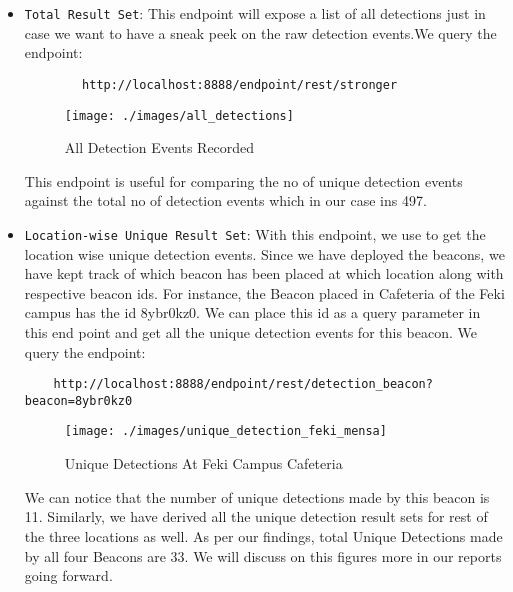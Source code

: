 \begin{itemize}
	\item \texttt{Total Result Set}: This endpoint will expose a list of all detections just in case we want to have a sneak peek on the  raw detection events.We query the  endpoint:
		\begin{verbatim}
		http://localhost:8888/endpoint/rest/stronger
		\end{verbatim}
		\begin{figure}[H]
			\centering
			\texttt{[image: ./images/all\_detections]}
			\caption{All Detection Events Recorded}
			\label{figure1:all_detection_events_recorded}
		\end{figure}
	This endpoint is useful for comparing the no of unique detection events against the total no of detection events which in our case ins 497.
		
	\item \texttt{Location-wise Unique Result Set}: With this endpoint, we use to get the location wise unique detection events. Since we have deployed the beacons, we have kept track of which beacon has been placed at which location along with respective beacon ids. For instance, the Beacon placed in Cafeteria of the Feki campus  has the id 8ybr0kz0. We can place this id as a query parameter in this end point and get all the unique detection events for this beacon.
	We query the endpoint:
	\begin{verbatim}
	http://localhost:8888/endpoint/rest/detection_beacon?beacon=8ybr0kz0
	\end{verbatim}
	\begin{figure}[H]
		\centering
		\texttt{[image: ./images/unique\_detection\_feki\_mensa]}
		\caption{Unique Detections At Feki Campus Cafeteria}
		\label{figure1:unique_detections_at_feki_campus_mensa}
	\end{figure}
	We can notice that the number of unique detections made by this beacon is 11. Similarly, we have derived all the unique detection result sets for rest of the three locations as well. As per our findings, total Unique Detections made by all four Beacons are 33. We will discuss on this figures more in our reports going forward.
	

\end{itemize}
